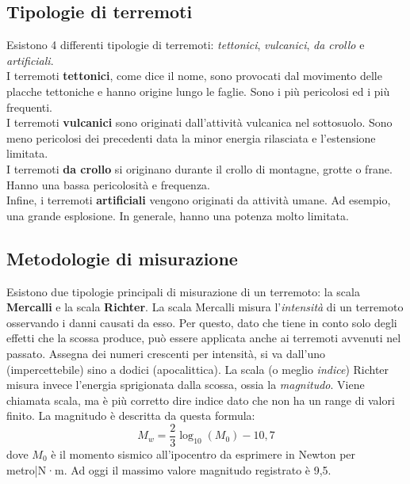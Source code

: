 \documentclass[a4paper,10pt]{memoir}
\begin{document}
\subsection{Tipologie di terremoti}
Esistono 4 differenti tipologie di terremoti: \textit{tettonici}, \textit{vulcanici}, \textit{da crollo} e \textit{artificiali}.
\\
I terremoti \textbf{tettonici}, come dice il nome, sono provocati dal movimento delle placche tettoniche e hanno origine lungo le faglie.
Sono i più pericolosi ed i più frequenti.
\\
I terremoti \textbf{vulcanici} sono originati dall'attività vulcanica nel sottosuolo. Sono meno pericolosi dei precedenti data la minor energia rilasciata e l'estensione limitata.
\\
I terremoti \textbf{da crollo} si originano durante il crollo di montagne, grotte o frane. Hanno una bassa pericolosità e frequenza.
\\
Infine, i terremoti \textbf{artificiali} vengono originati da attività umane. Ad esempio, una grande esplosione. In generale, hanno una potenza molto limitata.

\subsection{Metodologie di misurazione}
Esistono due tipologie principali di misurazione di un terremoto: la scala \textbf{Mercalli} e la scala \textbf{Richter}.
La scala Mercalli misura l'\textit{intensità} di un terremoto osservando i danni causati da esso. Per questo, dato che tiene in conto solo degli effetti che la scossa produce, può essere applicata anche ai terremoti avvenuti nel passato.
Assegna dei numeri crescenti per intensità, si va dall'uno (impercettebile) sino a dodici (apocalittica).
La scala (o meglio \textit{indice}) Richter misura invece l'energia sprigionata dalla scossa, ossia la \textit{magnitudo}. Viene chiamata scala, ma è più corretto dire indice dato che non ha un range di valori finito. La magnitudo è descritta da questa formula:
\begin{equation*}
  M_w = {\frac{2}{3}}\log_{10}(M_\mathrm{0}) - 10,7
\end{equation*}
dove $M_0$ è il momento sismico all'ipocentro da esprimere in Newton per metro|N·m.\cite{measure}
Ad oggi il massimo valore magnitudo registrato è 9,5.
\end{document}
